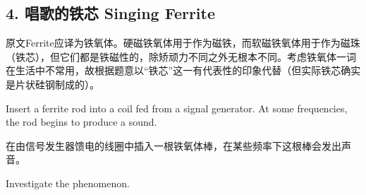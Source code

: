 \documentclass[a4paper,10pt,english]{sphinxmanual}
\begin{document}
\subsection{4. 唱歌的铁芯 \sphinxfootnotemark[3] Singing Ferrite}
\label{\detokenize{8. Appendix:singing-ferrite}}%
\begin{footnotetext}[3]\sphinxAtStartFootnote
原文Ferrite应译为铁氧体。硬磁铁氧体用于作为磁铁，而软磁铁氧体用于作为磁珠（铁芯），但它们都是铁磁性的，除矫顽力不同之外无根本不同。考虑铁氧体一词在生活中不常用，故根据题意以“铁芯”这一有代表性的印象代替（但实际铁芯确实是片状硅钢制成的）。
%
\end{footnotetext}\ignorespaces 
Insert a ferrite rod into a coil fed from a signal generator. At some frequencies, the rod begins to produce a sound.

在由信号发生器馈电的线圈中插入一根铁氧体棒，在某些频率下这根棒会发出声音。

Investigate the phenomenon.
\end{document}

